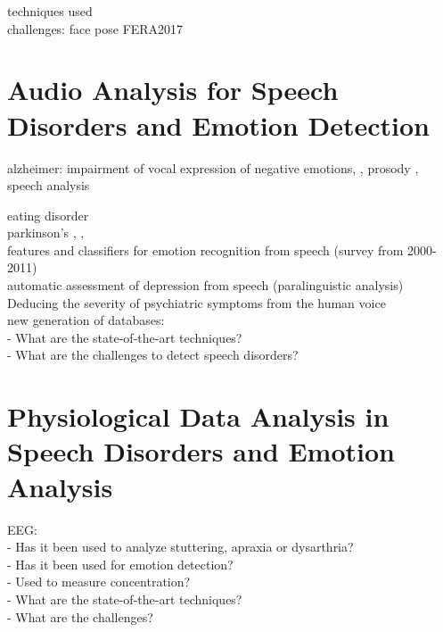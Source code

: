 techniques used\\



challenges: face pose FERA2017 \cite{Valstar2017}
\section{Audio Analysis for Speech Disorders and Emotion Detection}

alzheimer: impairment of vocal expression of negative emotions\cite{Zaytseva2014}, \cite{Lopez-de-Ipiña2015}, prosody \cite{Horley2010}, speech analysis \cite{Lopez-de-Ipiña2015b}\cite{Lopez-de-Ipiña2014}


eating disorder \cite{Schuller2015interspeech}\\

parkinson's \cite{Schuller2015interspeech}, \cite{Moebes2008}, \cite{Zhao2014}\\


features and classifiers for emotion recognition from speech (survey from 2000-2011)\cite{Anagnostopoulos2015survey}\\

automatic assessment of depression from speech (paralinguistic analysis)\cite{Cummins2016}\\

Deducing the severity of psychiatric symptoms from the human voice\cite{Singh2017}\\

new generation of databases: \cite{DouglasCowie2003}\\

-	What are the state-of-the-art techniques?\\
-	What are the challenges to detect speech disorders?\\


\section{Physiological Data Analysis in Speech Disorders and Emotion Analysis}

EEG:\\
-	Has it been used to analyze stuttering, apraxia or dysarthria?\\
-	Has it been used for emotion detection?\\
-	Used to measure concentration?\\
-	What are the state-of-the-art techniques?\\
-	What are the challenges?\\


